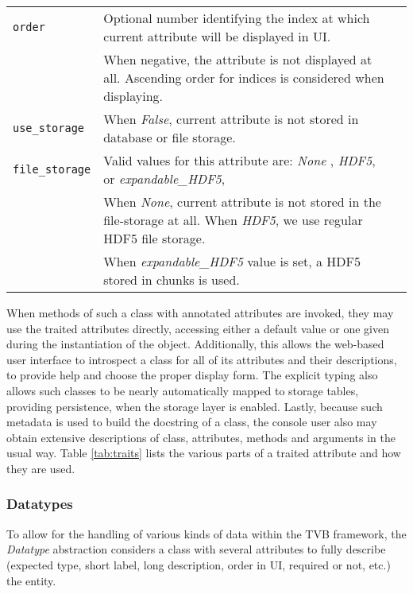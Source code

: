 \documentclass{bioinfo}
\begin{document}
\begin{center}
\begin{table*}[ht]
\begin{tabularx}{\textwidth}{lll}
			\texttt{order}            & Optional number identifying the index at which current attribute will be displayed in UI. \\
						  & When negative, the attribute is not displayed at all. Ascending order for indices is considered when displaying. \\
			\texttt{use\_storage}     & When \emph{False}, current attribute is not stored in database or file storage. \\
			\texttt{file\_storage}    & Valid values for this attribute are: \emph{None} , \emph{HDF5}, or  \emph{expandable\_HDF5}, \\
						  & When \emph{None}, current attribute is not stored in the file-storage at all. When \emph{HDF5}, we use regular HDF5 file storage. \\
						  & When \emph{expandable\_HDF5} value is set, a HDF5 stored in chunks is used. \\
			\bottomrule
			\end{tabularx}
  	\caption{TVB currently available Traited Attributes}
  	\label{tab:traits}
	\end{table*}
\end{center}


When methods of such a class with annotated attributes are invoked, they may use
the traited attributes directly, accessing either a default value or one given
during the instantiation of the object. Additionally, this allows the web-based
user interface to introspect a class for all of its attributes and their
descriptions, to provide help and choose the proper display form. The explicit
typing also allows such classes to be nearly automatically mapped to storage
tables, providing persistence, when the storage layer is enabled.  Lastly,
because such metadata is used to build the docstring of a class, the console
user also may obtain extensive descriptions of class, attributes, methods and
arguments in the usual way. Table \ref{tab:traits} lists the various parts 
of a traited attribute and how they are used. 

\subsubsection{Datatypes}

To allow for the handling of various kinds of data within the TVB framework, 
the \textit{Datatype} abstraction considers a class with several 
attributes to fully describe (expected type, short label, long
description, order in UI, required or not, etc.) the entity. 
\end{document}
